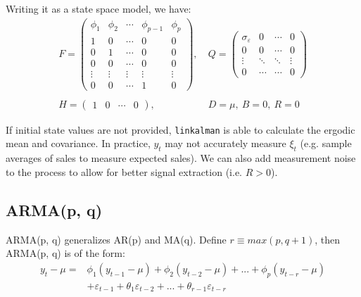 \documentclass[10pt, titlepage]{article}
\numberwithin{equation}{section}
\begin{document}
Writing it as a state space model, we have:
\begin{align*}
    F = \begin{pmatrix}
        \phi_1 & \phi_2 & \cdots & \phi_{p-1} & \phi_p \\
        1 & 0 & \cdots & 0 & 0 \\
        0 & 1 & \cdots & 0 & 0 \\
        0 & 0 & \cdots & 0 & 0 \\
        \vdots & \vdots & \vdots & \vdots & \vdots \\
        0 & 0 & \cdots & 1 & 0
    \end{pmatrix}, 
    &\ 
    Q = \begin{pmatrix}
        \sigma_{\varepsilon} & 0 & \cdots & 0 \\ 
        0 & 0 & \cdots & 0 \\
        \vdots & \ddots & \ddots & \vdots \\ 
        0 & \cdots & \cdots & 0
    \end{pmatrix} \\ \\
    H = \begin{pmatrix}
        1 & 0 & \cdots & 0
    \end{pmatrix}, 
    &\ 
    D = \mu, \ B = 0, \ R = 0
\end{align*}

If initial state values are not provided, \texttt{linkalman} is able to calculate the ergodic mean and covariance. In practice, $y_t$ may not accurately measure $\xi_t$ (e.g. sample averages of sales to measure expected sales). We can also add measurement noise to the process to allow for better signal extraction (i.e. $R>0$). 

\subsection{ARMA(p, q)}
ARMA(p, q) generalizes AR(p) and MA(q). Define $r \equiv max(p, q+1)$, then ARMA(p, q) is of the form:
\begin{align*}
    y_t-\mu =& \phi_1(y_{t-1}-\mu) + \phi_2(y_{t-2}-\mu) + ... + \phi_p(y_{t-r}-\mu) \\
    &+ \varepsilon_{t-1} + \theta_1\varepsilon_{t-2} + ... + \theta_{r-1}\varepsilon_{t-r}
\end{align*}
\end{document}
